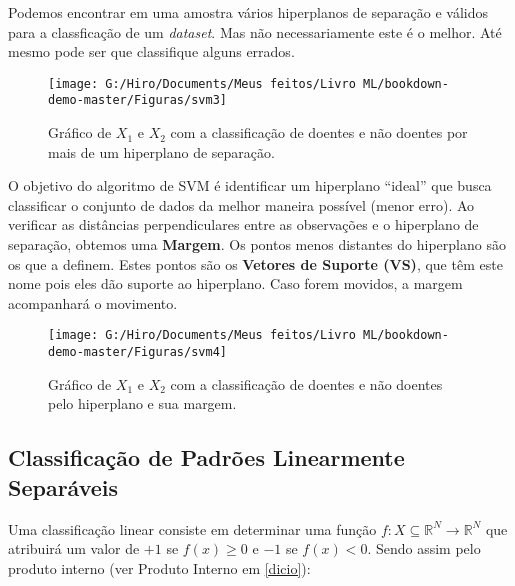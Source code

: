 \documentclass[
]{book}
\begin{document}
Podemos encontrar em uma amostra vários hiperplanos de separação e válidos para a classficação de um \emph{dataset}. Mas não necessariamente este é o melhor. Até mesmo pode ser que classifique alguns errados.

\begin{figure}

{\centering \texttt{[image: G:/Hiro/Documents/Meus feitos/Livro ML/bookdown-demo-master/Figuras/svm3]} 

}

\caption{Gráfico de \(X_1\) e \(X_2\) com a classificação de doentes e não doentes por mais de um hiperplano de separação.}\label{fig:svm3}
\end{figure}



O objetivo do algoritmo de SVM é identificar um hiperplano ``ideal'' que busca classificar o conjunto de dados da melhor maneira possível (menor erro). Ao verificar as distâncias perpendiculares entre as observações e o hiperplano de separação, obtemos uma \textbf{Margem}. Os pontos menos distantes do hiperplano são os que a definem. Estes pontos são os \textbf{Vetores de Suporte (VS)}, que têm este nome pois eles dão suporte ao hiperplano. Caso forem movidos, a margem acompanhará o movimento.

\begin{figure}

{\centering \texttt{[image: G:/Hiro/Documents/Meus feitos/Livro ML/bookdown-demo-master/Figuras/svm4]} 

}

\caption{Gráfico de \(X_1\) e \(X_2\) com a classificação de doentes e não doentes pelo hiperplano e sua margem.}\label{fig:svm4}
\end{figure}



\hypertarget{classificauxe7uxe3o-de-padruxf5es-linearmente-separuxe1veis}{%
\subsection{Classificação de Padrões Linearmente Separáveis}\label{classificauxe7uxe3o-de-padruxf5es-linearmente-separuxe1veis}}

Uma classificação linear consiste em determinar uma função \(f: X \subseteq \mathbb{R}^N \rightarrow \mathbb{R}^N\) que atribuirá um valor de \(+1\) se \(f(x)\geq 0\) e \(-1\) se \(f(x)<0\). Sendo assim pelo produto interno (ver Produto Interno em \ref{dicio}):
\end{document}
